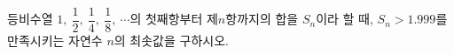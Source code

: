 등비수열 $1,\ \dfrac{1}{2},\ \dfrac{1}{4},\ \dfrac{1}{8},\ \cdots$의 첫째항부터 제$n$항까지의 합을 $S_n$이라 할 때, $S_n>1.999$를 만족시키는 자연수 $n$의 최솟값을 구하시오.
